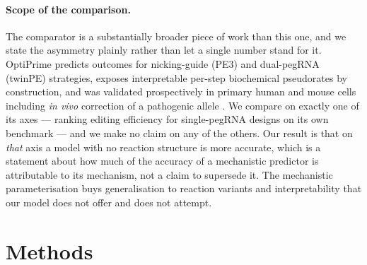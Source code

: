 \documentclass[11pt]{article}
\begin{document}
\paragraph{Scope of the comparison.}
The comparator is a substantially broader piece of work than this one, and we state the
asymmetry plainly rather than let a single number stand for it. OptiPrime predicts
outcomes for nicking-guide (PE3) and dual-pegRNA (twinPE) strategies, exposes
interpretable per-step biochemical pseudorates by construction, and was validated
prospectively in primary human and mouse cells including \emph{in vivo} correction of a
pathogenic allele \citep{hsu2026}. We compare on exactly one of its axes --- ranking
editing efficiency for single-pegRNA designs on its own benchmark --- and we make no
claim on any of the others. Our result is that on \emph{that} axis a model with no
reaction structure is more accurate, which is a statement about how much of the
accuracy of a mechanistic predictor is attributable to its mechanism, not a claim to
supersede it. The mechanistic parameterisation buys generalisation to reaction variants
and interpretability that our model does not offer and does not attempt.

\section{Methods}
\end{document}
